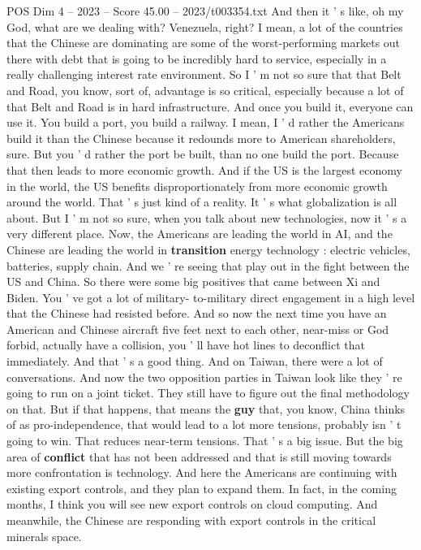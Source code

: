 \begin{textsample}{POS Dim 4 – 2023 – Score 45.00 – 2023/t003354.txt}
And then it ' s like, oh my God, what are we dealing with?
Venezuela, right?
I mean, a lot of the countries that the Chinese are dominating are some of the worst-performing markets out there with debt that is going to be incredibly hard to service, especially in a really challenging interest rate environment.
So I ' m not so sure that that Belt and Road, you know, sort of, advantage is so critical, especially because a lot of that Belt and Road is in hard infrastructure.
And once you build it, everyone can use it.
You build a port, you build a railway.
I mean, I ' d rather the Americans build it than the Chinese because it redounds more to American shareholders, sure.
But you ' d rather the port be built, than no one build the port.
Because that then leads to more economic growth.
And if the US is the largest economy in the world, the US benefits disproportionately from more economic growth around the world.
That ' s just kind of a reality.
It ' s what globalization is all about.
But I ' m not so sure, when you talk about new technologies, now it ' s a very different place.
Now, the Americans are leading the world in AI, and the Chinese are leading the world in \textbf{transition} energy technology : electric vehicles, batteries, supply chain.
And we ' re seeing that play out in the fight between the US and China.
So there were some big positives that came between Xi and Biden.
You ' ve got a lot of military- to-military direct engagement in a high level that the Chinese had resisted before.
And so now the next time you have an American and Chinese aircraft five feet next to each other, near-miss or God forbid, actually have a collision, you ' ll have hot lines to deconflict that immediately.
And that ' s a good thing.
And on Taiwan, there were a lot of conversations.
And now the two opposition parties in Taiwan look like they ' re going to run on a joint ticket.
They still have to figure out the final methodology on that.
But if that happens, that means the \textbf{guy} that, you know, China thinks of as pro-independence, that would lead to a lot more tensions, probably isn ' t going to win.
That reduces near-term tensions.
That ' s a big issue.
But the big area of \textbf{conflict} that has not been addressed and that is still moving towards more confrontation is technology.
And here the Americans are continuing with existing export controls, and they plan to expand them.
In fact, in the coming months, I think you will see new export controls on cloud computing.
And meanwhile, the Chinese are responding with export controls in the critical minerals space.

\end{textsample}
